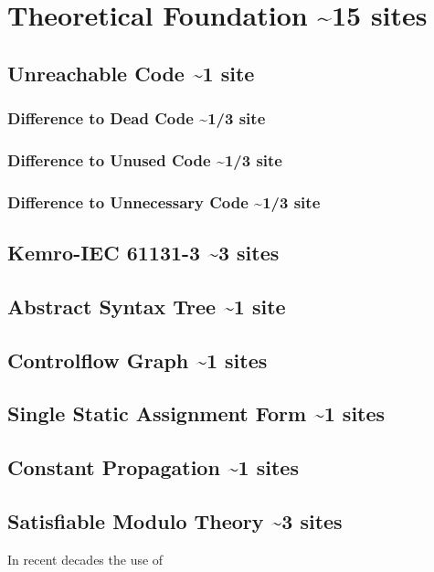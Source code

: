 
\chapter {Theoretical Foundation \textasciitilde 15 sites}
\label {cha:theoretical foundation}

\section{Unreachable Code  \textasciitilde 1 site}
\subsection{Difference to Dead Code \textasciitilde 1/3 site}
\subsection{Difference to Unused Code \textasciitilde 1/3 site}
\subsection{Difference to Unnecessary Code \textasciitilde 1/3 site}
\section{Kemro-IEC 61131-3 \textasciitilde 3 sites}
\section{Abstract Syntax Tree \textasciitilde 1 site}
\section{Controlflow Graph \textasciitilde 1 sites}
\section{Single Static Assignment Form \textasciitilde 1 sites}
\section{Constant Propagation \textasciitilde 1 sites}

\section{Satisfiable Modulo Theory \textasciitilde 3 sites}
In recent decades the use of 

